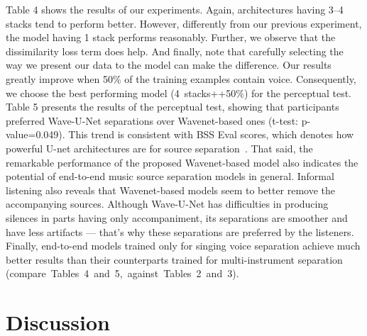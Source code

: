 \documentclass[a4paper]{article}
\begin{document}
Table 4 shows the results of our experiments. Again, architectures having 3--4 stacks tend to perform better. However, differently from our previous experiment, the model having 1 stack performs reasonably. 
Further, we observe that the dissimilarity loss term  does help. And finally, note that carefully selecting the way we present our data to the model can make the difference. Our results greatly improve when 50\% of the training examples contain voice.
Consequently, we choose the best performing model (4~stacks++50\%) for the perceptual test.
Table 5 presents the results of the perceptual test, showing that participants preferred Wave-U-Net separations over Wavenet-based ones (t-test: \mbox{p-value}=0.049). This trend is consistent with BSS Eval scores, which denotes how powerful U-net architectures are for source separation~\cite{jansson2017singing,stoller2018wave}. That said, the remarkable performance of the proposed Wavenet-based model also indicates the potential of end-to-end music source separation models in general. Informal listening also reveals that Wavenet-based models seem to better remove the accompanying sources. Although Wave-U-Net has difficulties in producing silences in parts having only accompaniment, its separations are smoother and have less artifacts --- that's why these separations are preferred by the listeners.
Finally, end-to-end models trained only for singing voice separation achieve much better results than their counterparts trained for multi-instrument separation \mbox{(compare Tables 4 and 5, against Tables 2 and 3).}

\vspace{-1mm}
\section{Discussion}
\end{document}
